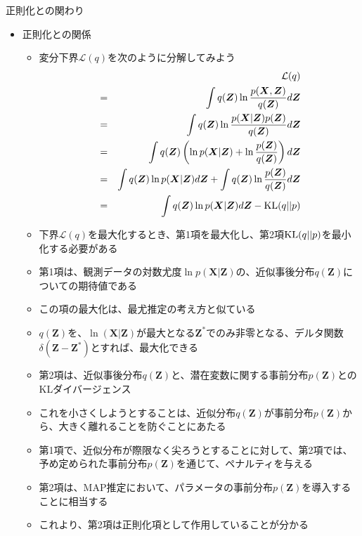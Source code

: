 \documentclass[dvipdfmx,notheorems,t]{beamer}
\begin{document}
\begin{frame}{正則化との関わり}

\begin{itemize}
	\item 正則化との関係
	\begin{itemize}
		\item 変分下界$\mathcal{L}(q)$を次のように分解してみよう
		\begin{eqnarray}
			&& \mathcal{L}(q) \nonumber \\
			&=& \int q(\bm{Z}) \ln \frac{p(\bm{X}, \bm{Z})}{q(\bm{Z})} d\bm{Z} \nonumber \\
			&=& \int q(\bm{Z}) \ln \frac{p(\bm{X} | \bm{Z}) p(\bm{Z})}{q(\bm{Z})} d\bm{Z} \nonumber \\
			&=& \int q(\bm{Z}) \left( \ln p(\bm{X} | \bm{Z}) + \ln \frac{p(\bm{Z})}{q(\bm{Z})} \right) d\bm{Z} \nonumber \\
			&=& \int q(\bm{Z}) \ln p(\bm{X} | \bm{Z}) d\bm{Z} + \int q(\bm{Z}) \ln \frac{p(\bm{Z})}{q(\bm{Z})} d\bm{Z} \nonumber \\
			&=& \int q(\bm{Z}) \ln p(\bm{X} | \bm{Z}) d\bm{Z} - \operatorname{KL}(q || p)
		\end{eqnarray}
		
		\item 下界$\mathcal{L}(q)$を最大化するとき、第1項を\alert{最大化}し、第2項$\operatorname{KL}(q || p)$を\alert{最小化}する必要がある
		\newline
		
		\item 第1項は、観測データの対数尤度$\ln p(\bm{X} | \bm{Z})$の、近似事後分布$q(\bm{Z})$についての期待値である
		\item この項の最大化は、\alert{最尤推定}の考え方と似ている
		\item $q(\bm{Z})$を、$\ln (\bm{X} | \bm{Z})$が最大となる$\bm{Z}^*$でのみ非零となる、デルタ関数$\delta(\bm{Z} - \bm{Z}^*)$とすれば、最大化できる
		\newline
		
		\item 第2項は、近似事後分布$q(\bm{Z})$と、潜在変数に関する事前分布$p(\bm{Z})$とのKLダイバージェンス
		\item これを小さくしようとすることは、近似分布$q(\bm{Z})$が事前分布$p(\bm{Z})$から、大きく離れることを防ぐことにあたる
		\newline
		
		\item 第1項で、近似分布が際限なく尖ろうとすることに対して、第2項では、\color{red}予め定められた事前分布$p(\bm{Z})$を通じて、ペナルティを与える\normalcolor
		\item 第2項は、MAP推定において、パラメータの事前分布$p(\bm{Z})$を導入することに相当する
		\newline
		\item これより、第2項は\alert{正則化項}として作用していることが分かる
	\end{itemize}
\end{itemize}

\end{frame}
\end{document}
